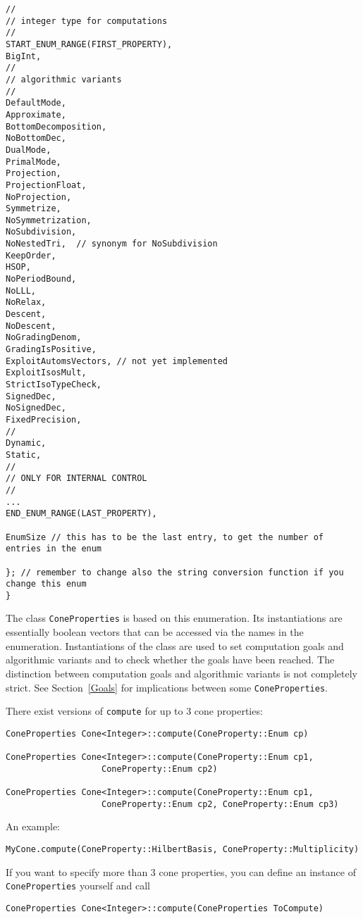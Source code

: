 \documentclass[12pt,a4paper]{scrartcl}
\theoremstyle{definition}
\begin{document}
\begin{small}
\begin{Verbatim}
//
// integer type for computations
//
START_ENUM_RANGE(FIRST_PROPERTY),
BigInt,
//
// algorithmic variants
//
DefaultMode,
Approximate,
BottomDecomposition,
NoBottomDec,
DualMode,
PrimalMode,
Projection,
ProjectionFloat,
NoProjection,
Symmetrize,
NoSymmetrization,
NoSubdivision,
NoNestedTri,  // synonym for NoSubdivision
KeepOrder,
HSOP,
NoPeriodBound,
NoLLL,
NoRelax,
Descent,
NoDescent,
NoGradingDenom,
GradingIsPositive,
ExploitAutomsVectors, // not yet implemented
ExploitIsosMult,
StrictIsoTypeCheck,
SignedDec,
NoSignedDec,
FixedPrecision,
//
Dynamic,
Static,
//
// ONLY FOR INTERNAL CONTROL
//
...
END_ENUM_RANGE(LAST_PROPERTY),

EnumSize // this has to be the last entry, to get the number of entries in the enum

}; // remember to change also the string conversion function if you change this enum
}
\end{Verbatim}

The class \verb|ConeProperties| is based on this enumeration. Its instantiations are essentially boolean vectors that can be accessed via the names in the enumeration. Instantiations of the class are used to set computation goals and algorithmic variants and to check whether the goals have been reached. The distinction between computation goals and algorithmic variants is not completely strict. See Section~\ref{Goals} for implications between some \verb|ConeProperties|.

There exist versions of \verb|compute| for up to $3$ cone properties:
\begin{Verbatim}
ConeProperties Cone<Integer>::compute(ConeProperty::Enum cp)

ConeProperties Cone<Integer>::compute(ConeProperty::Enum cp1, 
                   ConeProperty::Enum cp2)

ConeProperties Cone<Integer>::compute(ConeProperty::Enum cp1, 
                   ConeProperty::Enum cp2, ConeProperty::Enum cp3)
\end{Verbatim}

An example:
\begin{Verbatim}
MyCone.compute(ConeProperty::HilbertBasis, ConeProperty::Multiplicity)
\end{Verbatim}

If you want to specify more than $3$ cone properties, you can define an instance of \verb|ConeProperties| yourself and call
\begin{Verbatim}
ConeProperties Cone<Integer>::compute(ConeProperties ToCompute)
\end{Verbatim}


\end{small}
\end{document}
